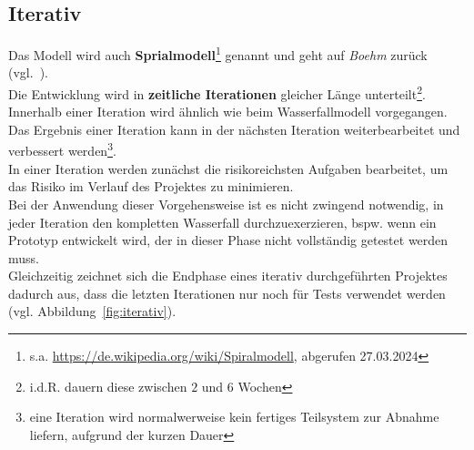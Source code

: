 
\subsection{Iterativ}

Das Modell wird auch \textbf{Sprialmodell}\footnote{
    s.a. \url{https://de.wikipedia.org/wiki/Spiralmodell}, abgerufen 27.03.2024
} genannt und geht auf \textit{Boehm} zurück (vgl.~\cite[]{Boe88}).\\

\noindent
Die Entwicklung wird in \textbf{zeitliche Iterationen} gleicher Länge unterteilt\footnote{
    i.d.R. dauern diese zwischen $2$ und $6$ Wochen
}.\\
Innerhalb einer Iteration wird ähnlich wie beim Wasserfallmodell vorgegangen.\\
Das Ergebnis einer Iteration kann in der nächsten Iteration weiterbearbeitet und verbessert werden\footnote{
    eine Iteration wird normalwerweise kein fertiges Teilsystem zur Abnahme liefern, aufgrund der kurzen Dauer
}.\\
In einer Iteration werden zunächst die risikoreichsten Aufgaben bearbeitet, um das Risiko im Verlauf des Projektes zu minimieren.\\

\noindent
Bei der Anwendung dieser Vorgehensweise ist es nicht zwingend notwendig, in jeder Iteration den kompletten Wasserfall durchzuexerzieren, bspw. wenn ein Prototyp entwickelt wird, der in dieser Phase nicht vollständig getestet werden muss.\\
Gleichzeitig zeichnet sich die Endphase eines iterativ durchgeführten Projektes dadurch aus, dass die letzten Iterationen nur noch für Tests verwendet werden (vgl. Abbildung~\ref{fig:iterativ}).

